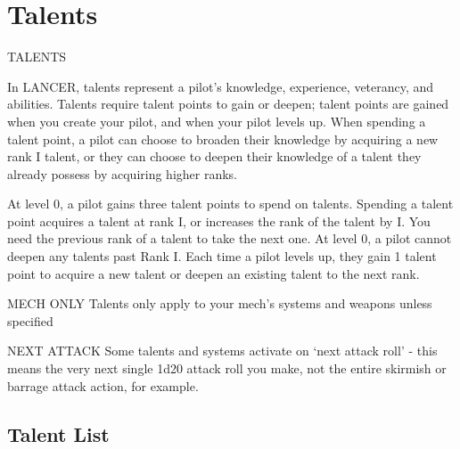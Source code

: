 \section{Talents}
    TALENTS

In LANCER, talents represent a pilot's knowledge, experience, veterancy, and abilities. Talents
require talent points to gain or deepen; talent points are gained when you create your pilot, and
when your pilot levels up. When spending a talent point, a pilot can choose to broaden their
knowledge by acquiring a new rank I talent, or they can choose to deepen their knowledge of a
talent they already possess by acquiring higher ranks.


At level 0, a pilot gains three talent points to spend on talents. Spending a talent point acquires a
talent at rank I, or increases the rank of the talent by I. You need the previous rank of a talent to
take the next one. At level 0, a pilot cannot deepen any talents past Rank I. Each time a pilot
levels up, they gain 1 talent point to acquire a new talent or deepen an existing talent to the next
rank.


                                                MECH ONLY
Talents only apply to your mech’s systems and weapons unless specified


                                               NEXT ATTACK
Some talents and systems activate on `next attack roll'  - this means the very next single 1d20
attack roll you make, not the entire skirmish or barrage attack action, for example.

\subsection{Talent List}





























